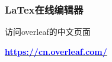 \documentclass[aspectratio=169]{ctexbeamer} %
\begin{document}
\begin{frame}[fragile]
\frametitle{LaTex在线编辑器}
\vspace*{1cm}
\large
访问overleaf的中文页面 \\
\vspace*{3cm}

\centering
\underline{\Huge \textbf{\href{https://cn.overleaf.com/}{\textcolor{blue}{https://cn.overleaf.com/}}}}\\

\end{frame}
\end{document}
